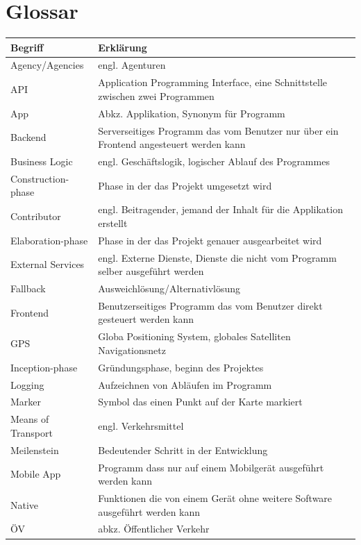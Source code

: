 \documentclass[a4paper,10pt,xetex]{article}
\begin{document}
\section{Glossar}\label{glossar}
\begin{longtabu} to \textwidth { | l | X[l] | }
\hline
\textbf{Begriff} & \textbf{Erklärung}\\\hline
\endhead

Agency/Agencies & engl. Agenturen\\\hline
API & Application Programming Interface, eine Schnittstelle zwischen zwei Programmen\\\hline
App & Abkz. Applikation, Synonym für Programm\\\hline
Backend & Serverseitiges Programm das vom Benutzer nur über ein Frontend angesteuert werden kann\\\hline
Business Logic & engl. Geschäftslogik, logischer Ablauf des Programmes\\\hline
Construction-phase & Phase in der das Projekt umgesetzt wird\\\hline
Contributor & engl. Beitragender, jemand der Inhalt für die Applikation erstellt\\\hline
Elaboration-phase & Phase in der das Projekt genauer ausgearbeitet wird\\\hline
External Services & engl. Externe Dienste, Dienste die nicht vom Programm selber ausgeführt werden\\\hline
Fallback & Ausweichlösung/Alternativlösung\\\hline
Frontend & Benutzerseitiges Programm das vom Benutzer direkt gesteuert werden kann\\\hline
GPS & Globa Positioning System, globales Satelliten Navigationsnetz\\\hline
Inception-phase & Gründungsphase, beginn des Projektes\\\hline
Logging & Aufzeichnen von Abläufen im Programm\\\hline
Marker & Symbol das einen Punkt auf der Karte markiert\\\hline
Means of Transport & engl. Verkehrsmittel\\\hline
Meilenstein & Bedeutender Schritt in der Entwicklung\\\hline
Mobile App & Programm dass nur auf einem Mobilgerät ausgeführt werden kann\\\hline
Native & Funktionen die von einem Gerät ohne weitere Software ausgeführt werden kann\\\hline
ÖV & abkz. Öffentlicher Verkehr\\\hline

\end{longtabu}
\end{document}
